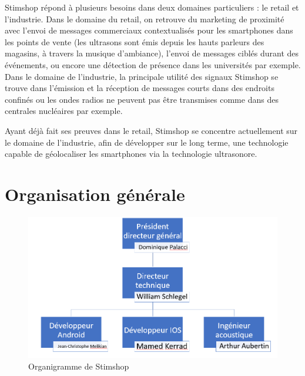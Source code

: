 \documentclass[12pt]{report}
\begin{document}
Stimshop répond à plusieurs besoins dans deux domaines particuliers : le retail et l'industrie.  Dans le domaine du retail, on retrouve du marketing de proximité avec l'envoi de messages commerciaux contextualisés pour les smartphones dans les points de vente (les ultrasons sont émis depuis les hauts parleurs des magasins, à travers la musique d'ambiance), l'envoi de messages ciblés durant des événements, ou encore une détection de présence dans les universités par exemple. Dans le domaine de l'industrie, la principale utilité des signaux Stimshop se trouve dans l'émission et la réception de messages courts dans des endroits confinés ou les ondes radios ne peuvent pas être transmises comme dans des centrales nucléaires par exemple. 

Ayant déjà fait ses preuves dans le retail, Stimshop se concentre actuellement sur le domaine de l'industrie, afin de développer sur le long terme, une technologie capable de géolocaliser les smartphones via la technologie ultrasonore. \\

	\section{Organisation générale}

\begin{figure}[h!]
\begin{center}
\includegraphics[scale=0.6]{organigramme.PNG}
\end{center}
\caption{Organigramme de Stimshop}
\label{Organigramme de Stimshop}
\end{figure}
\end{document}
